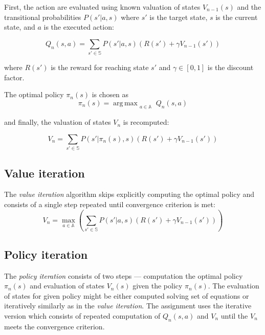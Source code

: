 \documentclass[10pt,journal,compsoc,twoside]{IEEEtran}
\DeclareMathOperator*{\argmax}{arg\,max}
\begin{document}
First, the action are evaluated using known valuation of states $V_{n-1}(s)$ and the transitional probabilities $P(s' | a, s)$ where $s'$ is the target state, $s$ is the current state, and $a$ is the executed action:

\begin{equation}
    Q_{n}(s,a) = \sum_{s' \in \mathbb{S}} P(s' | a, s)\left(R(s') + \gamma V_{n-1}(s')\right)
\end{equation}

where $R(s')$ is the reward for reaching state $s'$ and $\gamma \in [0,1]$ is the discount factor.

The optimal policy $\pi_{n}(s)$ is chosen as
\begin{equation}
    \pi_{n}(s) = \argmax_{\substack{
        a \in \mathbb{A}
        }
    } Q_{n}(s,a)
\end{equation}

and finally, the valuation of states $V_n$ is recomputed:

\begin{equation}
    V_n = \sum_{s' \in \mathbb{S}} P(s' | \pi_n(s), s)\left(R(s') + \gamma V_{n-1}(s')\right)
\end{equation}

\subsection{Value iteration}
The \textit{value iteration} algorithm skips explicitly computing the optimal policy and consists of a single step repeated until convergence criterion is met:
\begin{equation}
    V_n = \max_{a \in \mathbb{A}} \left( \sum_{s' \in \mathbb{S}} P(s' | a, s)\left(R(s') + \gamma V_{n-1}(s')\right)\right)
\end{equation}

\subsection{Policy iteration}
The \textit{policy iteration} consists of two steps --- computation the optimal policy $\pi_n(s)$ and evaluation of states $V_n(s)$ given the policy $\pi_n(s)$. The evaluation of states for given policy might be either computed solving set of equations or iteratively similarly as in the \textit{value iteration}. The assignment uses the iterative version which consists of repeated computation of $Q_{n}(s,a)$ and $V_n$ until the $V_n$ meets the convergence criterion.
\end{document}

